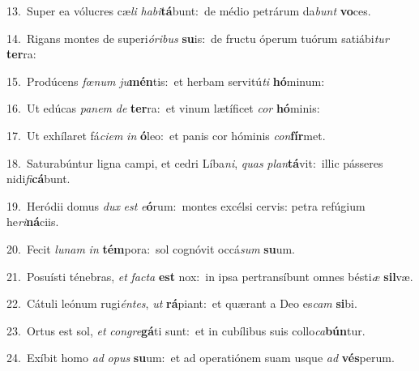 {\numbfont\textcolor{\numbcolor}{13.}}~Super ea vólucres cæ\textit{li} \textit{ha}\-\textit{bi}\textbf{tá}bunt:~\star de médio petrárum da\textit{bunt} \textbf{vo}\-ces.\par
{\numbfont\textcolor{\numbcolor}{14.}}~Rigans montes de superi\-\textit{ó}\-\textit{ri}\textit{bus} \textbf{su}\-is:~\star de fructu óperum tuórum satiábi\textit{tur} \textbf{ter}\-ra:\par
{\numbfont\textcolor{\numbcolor}{15.}}~Prodúcens \textit{fœ}\-\textit{num} \textit{ju}\-\textbf{mén}tis:~\star et herbam servitú\textit{ti} \textbf{hó}\-minum:\par
{\numbfont\textcolor{\numbcolor}{16.}}~Ut edúcas \textit{pa}\-\textit{nem} \textit{de} \textbf{ter}\-ra:~\star et vinum lætíficet \textit{cor} \textbf{hó}\-minis:\par
{\numbfont\textcolor{\numbcolor}{17.}}~Ut exhílaret fá\-\textit{ci}\-\textit{em} \textit{in} \textbf{ó}\-leo:~\star et panis cor hóminis \textit{con}\-\textbf{fír}met.\par
{\numbfont\textcolor{\numbcolor}{18.}}~Saturabúntur ligna campi, et cedri Líba\-\textit{ni}\-, \textit{quas} \textit{plan}\-\textbf{tá}vit:~\star illic pásseres nidi\-\textit{fi}\-\textbf{cá}bunt.\par
{\numbfont\textcolor{\numbcolor}{19.}}~Heródii domus \textit{dux} \textit{est} \textit{e}\-\textbf{ó}rum:~\star montes excélsi cervis: petra refúgium he\-\textit{ri}\-\textbf{ná}ciis.\par
{\numbfont\textcolor{\numbcolor}{20.}}~Fecit \textit{lu}\-\textit{nam} \textit{in} \textbf{tém}\-pora:~\star sol cognóvit occá\textit{sum} \textbf{su}\-um.\par
{\numbfont\textcolor{\numbcolor}{21.}}~Posuísti ténebras, \textit{et} \textit{fac}\-\textit{ta} \textbf{est} nox:~\star in ipsa pertransíbunt omnes bésti\textit{æ} \textbf{sil}\-væ.\par
{\numbfont\textcolor{\numbcolor}{22.}}~Cátuli leónum rugi\-\textit{én}\-\textit{tes}, \textit{ut} \textbf{rá}\-piant:~\star et quærant a Deo es\textit{cam} \textbf{si}\-bi.\par
{\numbfont\textcolor{\numbcolor}{23.}}~Ortus est sol, \textit{et} \textit{con}\-\textit{gre}\textbf{gá}ti sunt:~\star et in cubílibus suis collo\-\textit{ca}\-\textbf{bún}tur.\par
{\numbfont\textcolor{\numbcolor}{24.}}~Exíbit homo \textit{ad} \textit{o}\-\textit{pus} \textbf{su}\-um:~\star et ad operatiónem suam usque \textit{ad} \textbf{vés}\-perum.\par

